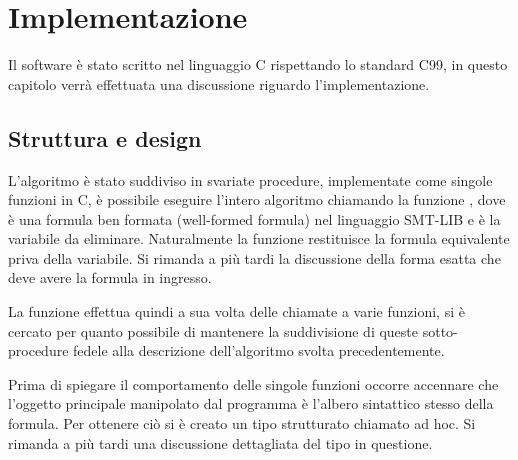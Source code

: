 \documentclass[11pt,letterpaper,twoside]{article}
\begin{document}
\newpage
\section{Implementazione}
Il software \`e stato scritto nel linguaggio C rispettando lo standard
C99\autocite{c99}, in questo capitolo verrà effettuata una discussione riguardo
l'implementazione.

\subsection{Struttura e design}

\begin{center}
\end{center}

L'algoritmo \`e stato suddiviso in svariate procedure, implementate come singole
funzioni in C, è possibile eseguire l'intero algoritmo chiamando la funzione
, dove  è una formula ben
formata (well-formed formula) nel linguaggio SMT-LIB\autocite{smtlib} e
 è la variabile da eliminare.
Naturalmente la funzione restituisce la formula equivalente priva della
variabile.
Si rimanda a più tardi la discussione della forma esatta che deve avere la
formula in ingresso.

La funzione  effettua quindi a sua volta delle chiamate a varie
funzioni, si è cercato per quanto possibile di mantenere la suddivisione di
queste sotto-procedure fedele alla descrizione dell'algoritmo svolta
precedentemente.

Prima di spiegare il comportamento delle singole funzioni occorre accennare che
l'oggetto principale manipolato dal programma è l'albero sintattico stesso della
formula. Per ottenere ciò si è creato un tipo strutturato chiamato
 ad hoc. Si rimanda a più tardi una discussione
dettagliata del tipo in questione.
\end{document}
